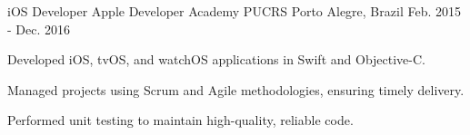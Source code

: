 \begin{cventries}
  \cventry
    {iOS Developer} %
    {Apple Developer Academy PUCRS} %
    {Porto Alegre, Brazil} %
    {Feb. 2015 - Dec. 2016} %
    {
      \begin{cvitems} %
        \item {Developed iOS, tvOS, and watchOS applications in Swift and Objective-C.}
        \item {Managed projects using Scrum and Agile methodologies, ensuring timely delivery.}
        \item {Performed unit testing to maintain high-quality, reliable code.}
      \end{cvitems}
    }

\end{cventries}
